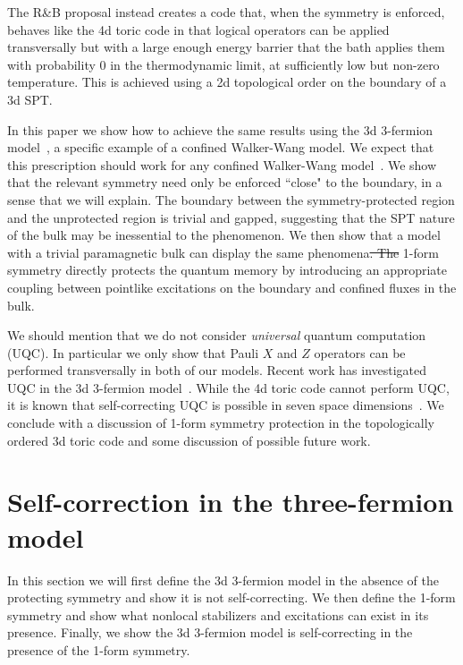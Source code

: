 \documentclass[twocolumn, longbibliography]{revtex4-2}
\providecommand{\DIFaddtex}[1]{{\protect\color{blue}\uwave{#1}}} %
\providecommand{\DIFdeltex}[1]{{\protect\color{red}\sout{#1}}}                      %
\providecommand{\DIFaddbegin}{} %
\providecommand{\DIFaddend}{} %
\providecommand{\DIFdelbegin}{} %
\providecommand{\DIFdelend}{} %
\providecommand{\DIFadd}[1]{\texorpdfstring{\DIFaddtex{#1}}{#1}} %
\providecommand{\DIFdel}[1]{\texorpdfstring{\DIFdeltex{#1}}{}} %
\newcommand{\DIFscaledelfig}{0.5}
\newlength{\DIFdelgraphicswidth} %
\newlength{\DIFdelgraphicsheight} %
\newcommand{\DIFaddincludegraphics}[2][]{{\color{blue}\fbox{\DIFOincludegraphics[#1]{#2}}}} %
\newcommand{\DIFdelincludegraphics}[2][]{%
\sbox{\DIFdelgraphicsbox}{\DIFOincludegraphics[#1]{#2}}%
\settoboxwidth{\DIFdelgraphicswidth}{\DIFdelgraphicsbox} %
\settoboxtotalheight{\DIFdelgraphicsheight}{\DIFdelgraphicsbox} %
\scalebox{\DIFscaledelfig}{%
\parbox[b]{\DIFdelgraphicswidth}{\usebox{\DIFdelgraphicsbox}\\[-\baselineskip] \rule{\DIFdelgraphicswidth}{0em}}\llap{\resizebox{\DIFdelgraphicswidth}{\DIFdelgraphicsheight}{%
\setlength{\unitlength}{\DIFdelgraphicswidth}%
\begin{picture}(1,1)%
\thicklines\linethickness{2pt} %
{\color[rgb]{1,0,0}\put(0,0){\framebox(1,1){}}}%
{\color[rgb]{1,0,0}\put(0,0){\line( 1,1){1}}}%
{\color[rgb]{1,0,0}\put(0,1){\line(1,-1){1}}}%
\end{picture}%
}\hspace*{3pt}}} %
} %
\DeclareRobustCommand{\DIFaddbegin}{\DIFOaddbegin \let\includegraphics\DIFaddincludegraphics} %
\DeclareRobustCommand{\DIFaddend}{\DIFOaddend \let\includegraphics\DIFOincludegraphics} %
\DeclareRobustCommand{\DIFdelbegin}{\DIFOdelbegin \let\includegraphics\DIFdelincludegraphics} %
\DeclareRobustCommand{\DIFdelend}{\DIFOaddend \let\includegraphics\DIFOincludegraphics} %
\begin{document}
The R\&B proposal \cite{RobertsBartlett} instead creates a code that, when the symmetry is enforced, behaves like the 4d toric code in that logical operators can be applied transversally but with a large enough energy barrier that the bath applies them with probability 0 in the thermodynamic limit, at sufficiently low but non-zero temperature. This is achieved using a 2d topological order on the boundary of a 3d SPT. 

In this paper we show how to achieve the same results using the 3d 3-fermion model~\cite{BurnellSoluble}, a specific example of a confined Walker-Wang model. We expect that this prescription should work for any confined Walker-Wang model~\cite{WalkerWang, vonKeyserlingkSurfaceAnyons}. We show that the relevant symmetry need only be enforced ``close" to the boundary, in a sense that we will explain. The boundary between the symmetry-protected region and the unprotected region is trivial and gapped, suggesting that the SPT nature of the bulk may be inessential to the phenomenon. 
We then show that a model with a trivial paramagnetic bulk can display the same phenomena\DIFdelbegin \DIFdel{. The }\DIFdelend \DIFaddbegin \DIFadd{, albeit with a }\DIFaddend 1-form \DIFaddbegin \DIFadd{symmetry that is not ``on-site"~}\cite{WenHigher}\DIFadd{. The }\DIFaddend symmetry directly protects the quantum memory by introducing an appropriate coupling between pointlike excitations on the boundary and confined fluxes in the bulk. 

We should mention that we do not consider \emph{universal} quantum computation (UQC). In particular we only show that Pauli $X$ and $Z$ operators can be performed transversally in both of our models. Recent work has investigated UQC in the 3d 3-fermion model~\cite{Roberts2020}. 
While the 4d toric code cannot perform UQC, it is known that self-correcting UQC is possible in seven space dimensions~\cite{Bombin2013}.
We conclude with a discussion of 1-form symmetry protection in the topologically ordered 3d toric code and some discussion of possible future work.

\section{Self-correction in the three-fermion model}

In this section we will first define the 3d 3-fermion model in the absence of the protecting symmetry and show it is not self-correcting. We then define the 1-form symmetry and show what nonlocal stabilizers and excitations can exist in its presence. Finally, we show the 3d 3-fermion model is self-correcting in the presence of the 1-form symmetry.
\end{document}
